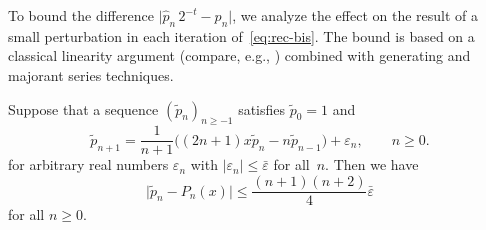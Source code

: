 \documentclass{siamart0216}
\newcommand{\abs}[1]{\mathopen| #1 \mathclose|}
\begin{document}
To bound the difference $\abs{\hat p_n \, 2^{-t} - p_n}$, we analyze
the effect on the result of a small perturbation in each iteration
of \eqref{eq:rec-bis}.
The bound is based on a classical linearity argument (compare, e.g.,
\cite{Wimp1984}) combined with generating and majorant series
techniques.

\begin{proposition} \label{prop:rec-error}
Suppose that a sequence $(\tilde p_n)_{n \geq -1}$ satisfies
$\tilde p_0 = 1$ and
\begin{equation} \label{eq:rec-pert}
  \tilde{p}_{n + 1} =
    \frac{1}{n+1}
    \bigl( (2n +1) x \tilde{p}_n - n \tilde{p}_{n-1} \bigr)
    + \varepsilon_n,
  \qquad n \geq 0.
\end{equation}
for arbitrary real numbers $\varepsilon_n$
with $\abs{\varepsilon_n} \leq \bar\varepsilon$ for all $n$.
Then we have
\[
  \abs{\tilde p_n  - P_n(x)}
  \leq \frac{(n+1)(n+2)}{4} \bar \varepsilon
\]
for all $n \geq 0$.
\end{proposition}
\end{document}
